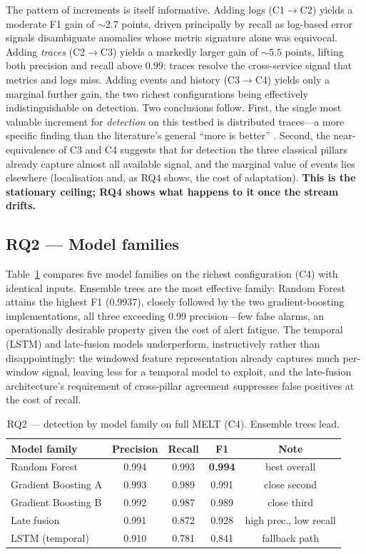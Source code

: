 \documentclass[acmsmall]{acmart}
\begin{document}
The pattern of increments is itself informative. Adding logs (C1$\rightarrow$C2) yields a moderate F1 gain of $\sim 2.7$ points, driven principally by recall as log-based error signals disambiguate anomalies whose metric signature alone was equivocal. Adding \emph{traces} (C2$\rightarrow$C3) yields a markedly larger gain of $\sim 5.5$ points, lifting both precision and recall above $0.99$: traces resolve the cross-service signal that metrics and logs miss. Adding events and history (C3$\rightarrow$C4) yields only a marginal further gain, the two richest configurations being effectively indistinguishable on detection. Two conclusions follow. First, the single most valuable increment for \emph{detection} on this testbed is distributed traces---a more specific finding than the literature's general ``more is better'' \cite{lomio2022,han2024}. Second, the near-equivalence of C3 and C4 suggests that for detection the three classical pillars already capture almost all available signal, and the marginal value of events lies elsewhere (localisation and, as RQ4 shows, the cost of adaptation). \textbf{This is the stationary ceiling; RQ4 shows what happens to it once the stream drifts.}

\subsection{RQ2 --- Model families}\label{sec:res-rq2}

Table~\ref{tab:rq2} compares five model families on the richest configuration (C4) with identical inputs. Ensemble trees are the most effective family: Random Forest attains the highest F1 ($0.9937$), closely followed by the two gradient-boosting implementations, all three exceeding $0.99$ precision---few false alarms, an operationally desirable property given the cost of alert fatigue. The temporal (LSTM) and late-fusion models underperform, instructively rather than disappointingly: the windowed feature representation already captures much per-window signal, leaving less for a temporal model to exploit, and the late-fusion architecture's requirement of cross-pillar agreement suppresses false positives at the cost of recall.

\begin{table}[t]
\caption{RQ2 --- detection by model family on full MELT (C4). Ensemble trees lead.}\label{tab:rq2}
\begin{tabular}{@{}lcccc@{}}
\toprule
Model family & Precision & Recall & F1 & Note \\
\midrule
Random Forest        & 0.994 & 0.993 & \textbf{0.994} & best overall \\
Gradient Boosting A  & 0.993 & 0.989 & 0.991 & close second \\
Gradient Boosting B  & 0.992 & 0.987 & 0.989 & close third \\
Late fusion          & 0.991 & 0.872 & 0.928 & high prec., low recall \\
LSTM (temporal)      & 0.910 & 0.781 & 0.841 & fallback path \\
\bottomrule
\end{tabular}
\end{table}
\end{document}
